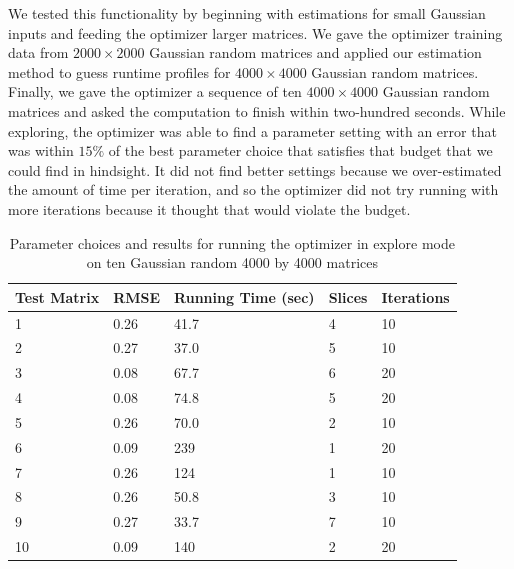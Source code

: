 We tested this functionality by beginning with estimations for small Gaussian inputs and feeding the optimizer larger matrices. We gave the optimizer training data from $2000 \times 2000$ Gaussian random matrices and applied our estimation method to guess runtime profiles for $4000 \times 4000$ Gaussian random matrices. Finally, we gave the optimizer a sequence of ten $4000 \times 4000$ Gaussian random matrices and asked the computation to finish within two-hundred seconds. While exploring, the optimizer was able to find a parameter setting with an error that was within $15\%$ of the best parameter choice that satisfies that budget that we could find in hindsight. It did not find better settings because we over-estimated the amount of time per iteration, and so the optimizer did not try running with more iterations because it thought that would violate the budget.

\begin{table}
\label{fig:4kAdaptiveTable}
\begin{center}
    \begin{tabular}{| p{2.2cm} | p{2.2cm} | p{2.2cm} | p{2.2cm} | p{2.2cm} |}
    \hline
    Test Matrix & RMSE & Running Time (sec) & Slices & Iterations \\ \hline
    1 & 0.26 & 41.7 & 4 & 10 \\ \hline
    2 & 0.27 & 37.0 & 5 & 10 \\ \hline
    3 & 0.08 & 67.7 & 6 & 20 \\ \hline
    4 & 0.08 & 74.8 & 5 & 20 \\ \hline
    5 & 0.26 & 70.0 & 2 & 10 \\ \hline
    6 & 0.09 & 239 & 1 & 20 \\ \hline
    7 & 0.26 & 124 & 1 & 10 \\ \hline
    8 & 0.26 & 50.8 & 3 & 10 \\ \hline
    9 & 0.27 & 33.7 & 7 & 10 \\ \hline
    10 & 0.09 & 140 & 2 & 20 \\ \hline
    \end{tabular}
\end{center}
\caption{Parameter choices and results for running the optimizer in explore mode on ten Gaussian random 4000 by 4000 matrices}
\end{table}